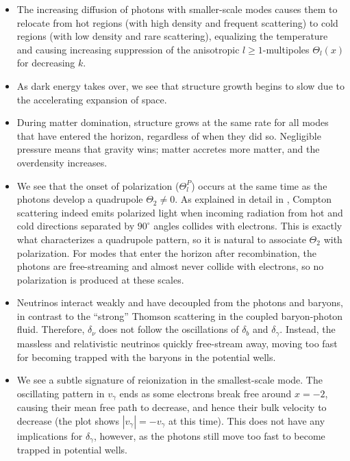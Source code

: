 \documentclass[10pt,a4paper]{article}
\begin{document}
\begin{itemize}
\item
The increasing diffusion of photons with smaller-scale modes
causes them to relocate
from hot regions (with high density and frequent scattering)
to cold regions (with low density and rare scattering),
equalizing the temperature and causing increasing suppression of the anisotropic $l \geq 1$-multipoles $\Theta_l(x)$ for decreasing $k$.

\item
As dark energy takes over,
we see that structure growth begins to slow due to the accelerating expansion of space.

\item
During matter domination,
structure grows at the same rate for all modes that have entered the horizon,
regardless of when they did so.
Negligible pressure means that gravity wins; matter accretes more matter, and the overdensity increases.

\item
We see that the onset of polarization ($\Theta^P_l$) occurs at the same time as the photons develop a quadrupole $\Theta_2 \neq 0$.
As explained in detail in \cite[section 10.2]{dodelsonModernCosmology2021},
Compton scattering indeed emits polarized light
when incoming radiation from hot and cold directions separated by $90^\circ$ angles
collides with electrons.
This is exactly what characterizes a quadrupole pattern,
so it is natural to associate $\Theta_2$ with polarization.
For modes that enter the horizon after recombination,
the photons are free-streaming and almost never collide with electrons,
so no polarization is produced at these scales.

\item
Neutrinos interact weakly and have decoupled from the photons and baryons, in contrast to the ``strong'' Thomson scattering in the coupled baryon-photon fluid.
Therefore, $\delta_\nu$ does not follow the oscillations of $\delta_b$ and $\delta_\gamma$.
Instead, the massless and relativistic neutrinos quickly free-stream away, moving too fast for becoming trapped with the baryons in the potential wells.

\item
We see a subtle signature of reionization in the smallest-scale mode.
The oscillating pattern in $v_\gamma$ ends as some electrons break free around $x=-2$,
causing their mean free path to decrease, and hence their bulk velocity to decrease (the plot shows $|v_\gamma| = -v_\gamma$ at this time).
This does not have any implications for $\delta_\gamma$, however,
as the photons still move too fast to become trapped in potential wells.


\end{itemize}
\end{document}
